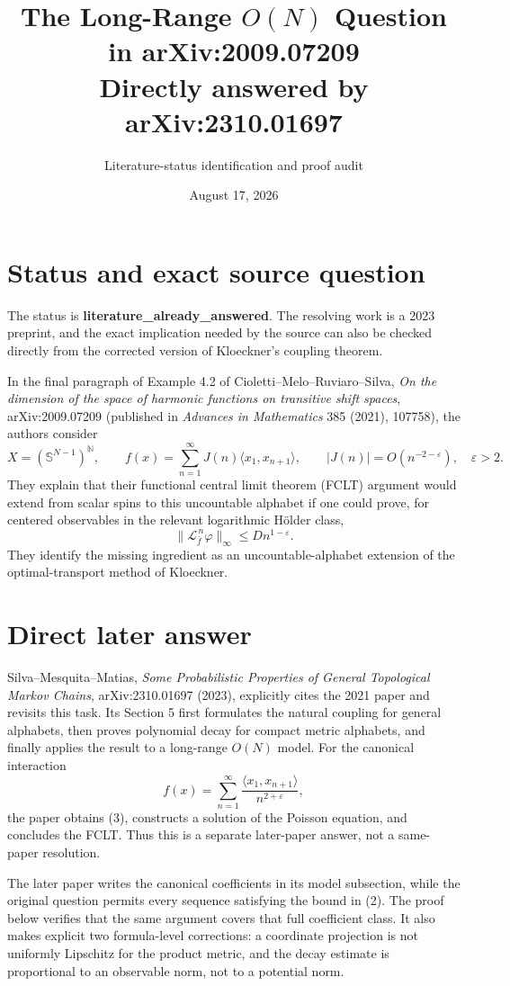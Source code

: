 \documentclass[11pt]{article}
\title{The Long-Range \(O(N)\) Question in arXiv:2009.07209\\
\large Directly answered by arXiv:2310.01697}
\author{Literature-status identification and proof audit}
\date{August 17, 2026}
\newcommand{\Sph}{\mathbb S}
\newcommand{\cL}{\mathscr L}
\begin{document}
\maketitle

\section*{Status and exact source question}

The status is \textbf{literature\_already\_answered}.  The resolving work is a
2023 preprint, and the exact implication needed by the source can also be checked
directly from the corrected version of Kloeckner's coupling theorem.

In the final paragraph of Example 4.2 of Cioletti--Melo--Ruviaro--Silva,
\emph{On the dimension of the space of harmonic functions on transitive shift
spaces}, arXiv:2009.07209 (published in \emph{Advances in Mathematics} 385
(2021), 107758), the authors consider
\[
 X=(\Sph^{N-1})^{\mathbb N},\qquad
 f(x)=\sum_{n=1}^{\infty}J(n)\langle x_1,x_{n+1}\rangle,
 \qquad |J(n)|=O(n^{-2-\varepsilon}),\quad \varepsilon>2.
 \tag{2}
\]
They explain that their functional central limit theorem (FCLT) argument would
extend from scalar spins to this uncountable alphabet if one could prove, for
centered observables in the relevant logarithmic Hölder class,
\[
 \|\cL_{\bar f}^{\,n}\varphi\|_\infty\le D n^{1-\varepsilon}.
 \tag{3}
\]
They identify the missing ingredient as an uncountable-alphabet extension of the
optimal-transport method of Kloeckner.

\section*{Direct later answer}

Silva--Mesquita--Matias, \emph{Some Probabilistic Properties of General
Topological Markov Chains}, arXiv:2310.01697 (2023), explicitly cites the 2021
paper and revisits this task.  Its Section 5 first formulates the natural coupling
for general alphabets, then proves polynomial decay for compact metric alphabets,
and finally applies the result to a long-range \(O(N)\) model.  For the canonical
interaction
\[
 f(x)=\sum_{n=1}^{\infty}
      \frac{\langle x_1,x_{n+1}\rangle}{n^{2+\varepsilon}},
\]
the paper obtains (3), constructs a solution of the Poisson equation, and
concludes the FCLT.  Thus this is a separate later-paper answer, not a same-paper
resolution.

The later paper writes the canonical coefficients in its model subsection, while
the original question permits every sequence satisfying the bound in (2).  The
proof below verifies that the same argument covers that full coefficient class.
It also makes explicit two formula-level corrections: a coordinate projection is
not uniformly Lipschitz for the product metric, and the decay estimate is
proportional to an observable norm, not to a potential norm.
\end{document}
